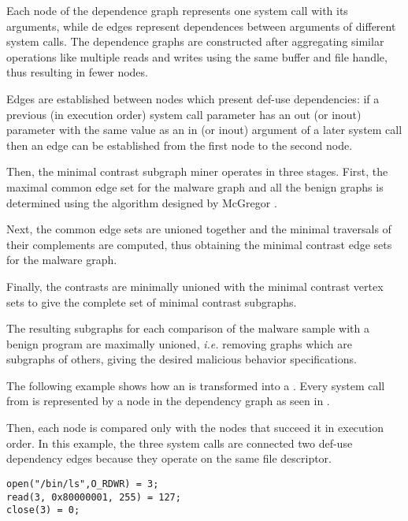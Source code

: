 Each node of the dependence graph represents one system call with its arguments, while de edges represent dependences between arguments of different system calls. The dependence graphs are constructed after aggregating similar operations like multiple reads and writes using the same buffer and file handle, thus resulting in fewer nodes.

Edges are established between nodes which present def-use dependencies: if a previous (in execution order) system call parameter has an out (or inout) parameter with the same value as an in (or inout) argument of a later system call then an edge can be established from the first node to the second node.

Then, the minimal contrast subgraph miner operates in three stages. First, the maximal common edge set for the malware graph and all the benign graphs is determined using the algorithm designed by McGregor \cite{common-subgraph}. 

Next, the common edge sets are unioned together and the minimal traversals of their complements are computed, thus obtaining the minimal contrast edge sets for the malware graph.

Finally, the contrasts are minimally unioned with the minimal contrast vertex sets to give the complete set of minimal contrast subgraphs.

The resulting subgraphs for each comparison of the malware sample with a benign program are maximally unioned, \textit{i.e.} removing graphs which are subgraphs of others, giving the desired malicious behavior specifications.

The following example shows how an  is transformed into a . Every system call from  is represented by a node in the dependency graph as seen in . 

Then, each node is compared only with the nodes that succeed it in execution order. In this example, the three system calls are connected two def-use dependency edges because they operate on the same file descriptor.

\lstset{language=C,caption=System call trace,label=lst:syscall-trace}
\begin{lstlisting}
open("/bin/ls",O_RDWR) = 3;
read(3, 0x80000001, 255) = 127;
close(3) = 0;
\end{lstlisting}


